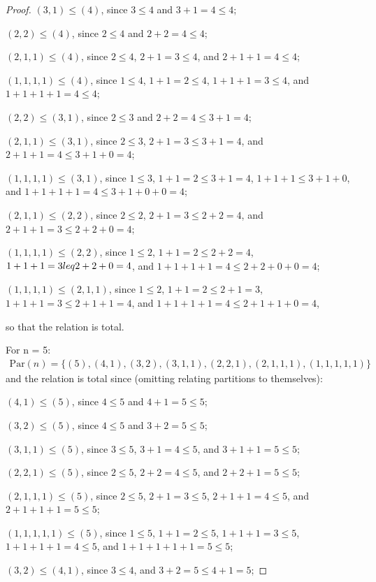 \documentclass[12pt]{extarticle}
\newcommand{\set}[1]{\{#1\}}
\newcommand{\<}{\langle}
\renewcommand{\>}{\rangle}
\theoremstyle{definition}
\begin{document}
\begin{proof}
  $(3,1) \leq (4)$, since $3 \leq 4$ and $3 + 1 = 4 \leq 4$;

  $(2,2) \leq (4)$, since $2 \leq 4$ and $2+2 = 4 \leq 4$;

  $(2,1,1) \leq (4)$, since $ 2 \leq 4 $, $2+1=3 \leq 4$, and $2+1+1 = 4 \leq 4$;

  $(1,1,1,1) \leq (4)$, since $1 \leq 4$, $1+1=2 \leq 4$, $1+1+1=3 \leq 4$, and $1+1+1+1 = 4\leq 4$;

  $(2,2) \leq (3,1)$, since $ 2 \leq 3$ and $2+2=4 \leq 3+1=4 $;

  $(2,1,1) \leq (3,1)$, since $2 \leq 3$, $2+1=3 \leq 3+1 = 4$, and $2+1+1 = 4 \leq 3+1+0 = 4$;

  $(1,1,1,1) \leq (3,1)$, since $1 \leq 3$, $1+1=2 \leq 3+1=4$, $1+1+1 \leq 3+1+0$, and $1+1+1+1 = 4 \leq 3+1+0+0 = 4$;

  $(2,1,1) \leq (2,2)$, since $ 2 \leq 2$, $2+1 = 3 \leq 2+2 = 4$, and $2+1+1 = 3 \leq 2+2+0=4$;

  $(1,1,1,1) \leq (2,2)$, since $1 \leq 2$, $1+1 = 2 \leq 2+2=4$, $1+1+1 = 3 \\leq 2+2+0 = 4$, and $1+1+1+1 = 4 \leq 2+2+0+0=4$;

  $(1,1,1,1) \leq (2,1,1)$, since $1 \leq 2$, $1+1=2 \leq 2+1=3$, $1+1+1=3 \leq 2+1+1=4$, and $1+1+1+1=4 \leq 2+1+1+0 = 4$,

  so that the relation is total.

  For n = 5:
  \begin{align*}
    \text{Par}(n) = \set{(5), (4,1), (3,2), (3,1,1), (2,2,1), (2,1,1,1), (1,1,1,1,1)}
  \end{align*}
  and the relation is total since (omitting relating partitions to themselves):

  $(4,1) \leq (5)$, since $ 4 \leq 5$ and $4 + 1 = 5 \leq 5 $;

  $(3,2) \leq (5)$, since $4 \leq 5$ and $3+2=5 \leq 5$;

  $(3,1,1) \leq (5)$, since $3 \leq 5$, $3+1=4 \leq 5$, and $3+1+1=5 \leq 5$;

  $(2,2,1) \leq (5)$, since $2 \leq 5$, $2+2=4 \leq 5$, and $2+2+1 = 5 \leq 5$;

  $(2,1,1,1) \leq (5)$, since $2 \leq 5$, $2+1=3 \leq 5$, $2+1+1=4 \leq 5$, and $2+1+1+1 = 5 \leq 5$;

  $(1,1,1,1,1) \leq (5)$, since $1 \leq 5$, $1+1=2 \leq 5$, $1+1+1 = 3 \leq 5$, $1+1+1+1 = 4 \leq 5$, and $1+1+1+1+1 = 5 \leq 5$;

  $(3,2) \leq (4,1)$, since $ 3 \leq 4$, and $3 + 2 = 5 \leq 4+1 = 5$;


\end{proof}
\end{document}
